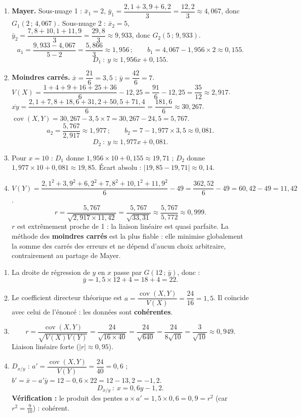\documentclass[11pt]{article}
\begin{document}
\begin{corrige}
\begin{enumerate}
\item \textbf{Mayer.} Sous-nuage 1 : $\bar{x}_1=2$, $\bar{y}_1=\dfrac{2{,}1+3{,}9+6{,}2}{3}=\dfrac{12{,}2}{3}\approx4{,}067$, donc $G_1(2\,;\,4{,}067)$.
Sous-nuage 2 : $\bar{x}_2=5$, $\bar{y}_2=\dfrac{7{,}8+10{,}1+11{,}9}{3}=\dfrac{29{,}8}{3}\approx9{,}933$, donc $G_2(5\,;\,9{,}933)$.
\[
a_1=\frac{9{,}933-4{,}067}{5-2}=\frac{5{,}866}{3}\approx1{,}956\,;\qquad b_1=4{,}067-1{,}956\times2\approx0{,}155.
\]
\[
D_1\ :\ y\approx1{,}956x+0{,}155.
\]
\item \textbf{Moindres carrés.} $\bar{x}=\dfrac{21}{6}=3{,}5$ ; $\bar{y}=\dfrac{42}{6}=7$.
$V(X)=\dfrac{1+4+9+16+25+36}{6}-12{,}25=\dfrac{91}{6}-12{,}25=\dfrac{35}{12}\approx2{,}917$.
$\overline{xy}=\dfrac{2{,}1+7{,}8+18{,}6+31{,}2+50{,}5+71{,}4}{6}=\dfrac{181{,}6}{6}\approx30{,}267$.
$\operatorname{cov}(X,Y)=30{,}267-3{,}5\times7=30{,}267-24{,}5=5{,}767$.
\[
a_2=\frac{5{,}767}{2{,}917}\approx1{,}977\,;\qquad b_2=7-1{,}977\times3{,}5\approx0{,}081.
\]
\[
D_2\ :\ y\approx1{,}977x+0{,}081.
\]
\item Pour $x=10$ : $D_1$ donne $1{,}956\times10+0{,}155\approx19{,}71$ ; $D_2$ donne $1{,}977\times10+0{,}081\approx19{,}85$.
Écart absolu : $|19{,}85-19{,}71|\approx0{,}14$.
\item $V(Y)=\dfrac{2{,}1^2+3{,}9^2+6{,}2^2+7{,}8^2+10{,}1^2+11{,}9^2}{6}-49=\dfrac{362{,}52}{6}-49=60{,}42-49=11{,}42$.
\[
r=\frac{5{,}767}{\sqrt{2{,}917\times11{,}42}}=\frac{5{,}767}{\sqrt{33{,}31}}\approx\frac{5{,}767}{5{,}772}\approx0{,}999.
\]
$r$ est extrêmement proche de 1 : la liaison linéaire est quasi parfaite. La méthode des \textbf{moindres carrés} est la plus fiable : elle minimise globalement la somme des carrés des erreurs et ne dépend d'aucun choix arbitraire, contrairement au partage de Mayer.
\end{enumerate}
\end{corrige}

\begin{corrige}
\begin{enumerate}
\item La droite de régression de $y$ en $x$ passe par $G(12\,;\,\bar{y})$, donc :
\[
\bar{y}=1{,}5\times12+4=18+4=22.
\]
\item Le coefficient directeur théorique est $a=\dfrac{\operatorname{cov}(X,Y)}{V(X)}=\dfrac{24}{16}=1{,}5$. Il coïncide avec celui de l'énoncé : les données sont \textbf{cohérentes}.
\item \[
r=\frac{\operatorname{cov}(X,Y)}{\sqrt{V(X)V(Y)}}=\frac{24}{\sqrt{16\times40}}=\frac{24}{\sqrt{640}}=\frac{24}{8\sqrt{10}}=\frac{3}{\sqrt{10}}\approx0{,}949.
\]
Liaison linéaire forte ($|r|\approx0{,}95$).
\item $D_{x/y}$ : $a'=\dfrac{\operatorname{cov}(X,Y)}{V(Y)}=\dfrac{24}{40}=0{,}6$ ; $b'=\bar{x}-a'\bar{y}=12-0{,}6\times22=12-13{,}2=-1{,}2$.
\[
D_{x/y}\ :\ x=0{,}6y-1{,}2.
\]
\textbf{Vérification :} le produit des pentes $a\times a'=1{,}5\times0{,}6=0{,}9=r^2$ (car $r^2=\frac{9}{10}$) : cohérent.
\end{enumerate}
\end{corrige}
\end{document}
